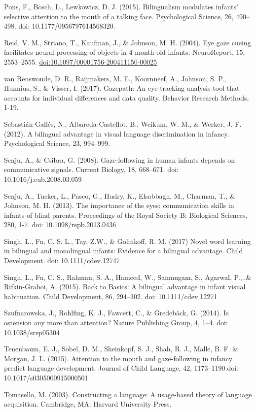 \documentclass[,man,floatsintext]{apa6}
\begin{document}
Pons, F., Bosch, L., Lewkowicz, D. J. (2015). Bilingualism modulates infants' selective attention to the mouth of a talking face. Psychological Science, 26, 490--498. doi: 10.1177/0956797614568320.

Reid, V. M., Striano, T., Kaufman, J., \& Johnson, M. H. (2004). Eye gaze cueing facilitates neural processing of objects in 4-month-old infants. NeuroReport, 15, 2553--2555. \url{doi:10.1097/00001756-200411150-00025}

van Renswoude, D. R., Raijmakers, M. E., Koornneef, A., Johnson, S. P., Hunnius, S., \& Visser, I. (2017). Gazepath: An eye-tracking analysis tool that accounts for individual differences and data quality. Behavior Research Methods, 1-19.

Sebastián-Gallés, N., Albareda-Castellot, B., Weikum, W. M., \& Werker, J. F. (2012). A bilingual advantage in visual language discrimination in infancy. Psychological Science, 23, 994--999.

Senju, A., \& Csibra, G. (2008). Gaze-following in human infants depends on communicative signals. Current Biology, 18, 668--671. doi: 10.1016/j.cub.2008.03.059

Senju, A., Tucker, L., Pasco, G., Hudry, K., Elsabbagh, M., Charman, T., \& Johnson, M. H. (2013). The importance of the eyes: communication skills in infants of blind parents. Proceedings of the Royal Society B: Biological Sciences, 280, 1-7. doi: 10.1098/rspb.2013.0436

Singh, L., Fu, C. S. L., Tay, Z.W., \& Golinkoff, R. M. (2017) Novel word learning in bilingual and monolingual infants: Evidence for a bilingual advantage. Child Development. doi: 10.1111/cdev.12747

Singh, L., Fu, C. S., Rahman, S. A., Hameed, W., Sanmugam, S., Agarwal, P.,..\& Rifkin-Graboi, A. (2015). Back to Basics: A bilingual advantage in infant visual habituation. Child Development, 86, 294--302. doi: 10.1111/cdev.12271

Szufnarowska, J., Rohlfing, K. J., Fawcett, C., \& Gredebäck, G. (2014). Is ostension any more than attention? Nature Publishing Group, 4, 1--4. doi: 10.1038/srep05304

Tenenbaum, E. J., Sobel, D. M., Sheinkopf, S. J., Shah, R. J., Malle, B. F. \& Morgan, J. L. (2015). Attention to the mouth and gaze-following in infancy predict language development. Journal of Child Language, 42, 1173--1190.doi: 10.1017/s0305000915000501

Tomasello, M. (2003). Constructing a language: A usage-based theory of language acquisition. Cambridge, MA: Harvard University Press.
\end{document}
